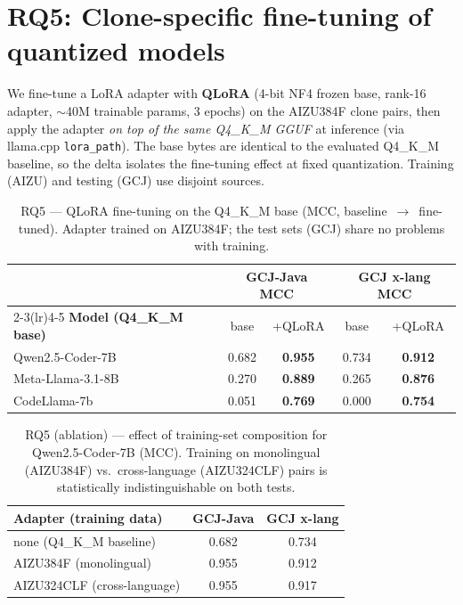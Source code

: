 \documentclass[11pt]{article}
\newcommand{\best}[1]{\textbf{#1}}
\begin{document}
\section{RQ5: Clone-specific fine-tuning of quantized models}
We fine-tune a LoRA adapter with \textbf{QLoRA} (4-bit NF4 frozen base, rank-16
adapter, $\sim$40M trainable params, 3 epochs) on the AIZU384F clone pairs, then
apply the adapter \emph{on top of the same Q4\_K\_M GGUF} at inference (via
llama.cpp \texttt{lora\_path}). The base bytes are identical to the evaluated
Q4\_K\_M baseline, so the delta isolates the fine-tuning effect at fixed
quantization. Training (AIZU) and testing (GCJ) use disjoint sources.

\begin{table}[htbp]
  \centering
  \caption{RQ5 --- QLoRA fine-tuning on the Q4\_K\_M base (MCC,
           baseline~$\rightarrow$~fine-tuned). Adapter trained on AIZU384F;
           the test sets (GCJ) share no problems with training.}
  \label{tab:rq5}
  \small
  \begin{tabular}{lcccc}
    \toprule
    & \multicolumn{2}{c}{\textbf{GCJ-Java MCC}} & \multicolumn{2}{c}{\textbf{GCJ x-lang MCC}}\\
    \cmidrule(lr){2-3}\cmidrule(lr){4-5}
    \textbf{Model (Q4\_K\_M base)} & base & +QLoRA & base & +QLoRA \\
    \midrule
    Qwen2.5-Coder-7B  & 0.682 & \best{0.955} & 0.734 & \best{0.912} \\
    Meta-Llama-3.1-8B & 0.270 & \best{0.889} & 0.265 & \best{0.876} \\
    CodeLlama-7b      & 0.051 & \best{0.769} & 0.000 & \best{0.754} \\
    \bottomrule
  \end{tabular}
\end{table}

\begin{table}[htbp]
  \centering
  \caption{RQ5 (ablation) --- effect of training-set composition for Qwen2.5-Coder-7B
           (MCC). Training on monolingual (AIZU384F) vs.\ cross-language
           (AIZU324CLF) pairs is statistically indistinguishable on both tests.}
  \label{tab:rq5-ablation}
  \small
  \begin{tabular}{lcc}
    \toprule
    \textbf{Adapter (training data)} & \textbf{GCJ-Java} & \textbf{GCJ x-lang} \\
    \midrule
    none (Q4\_K\_M baseline)       & 0.682 & 0.734 \\
    AIZU384F (monolingual)         & 0.955 & 0.912 \\
    AIZU324CLF (cross-language)    & 0.955 & 0.917 \\
    \bottomrule
  \end{tabular}
\end{table}
\end{document}

